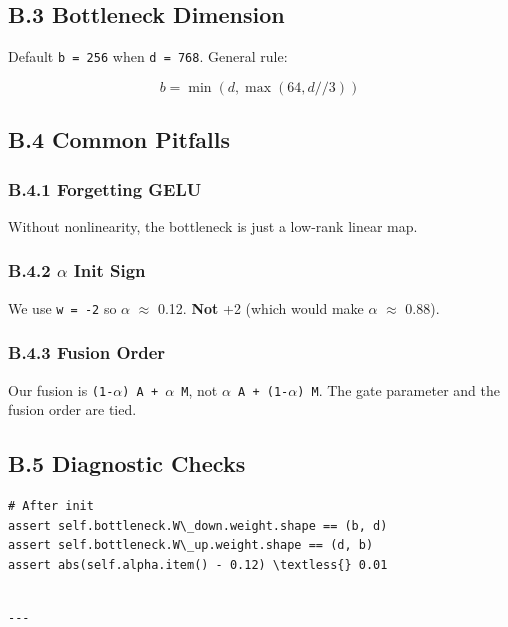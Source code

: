\subsection{B.3 Bottleneck Dimension}

Default \texttt{b = 256} when \texttt{d = 768}. General rule:

\[
b = \min(d, \max(64, d // 3))
\tag{B.1}
\]

\subsection{B.4 Common Pitfalls}

\subsubsection{B.4.1 Forgetting GELU}

Without nonlinearity, the bottleneck is just a low-rank linear map.

\subsubsection{B.4.2 $\alpha$ Init Sign}

We use \texttt{w  = -2} so $\alpha$  $\approx$ 0.12. \textbf{Not} +2 (which would make $\alpha$ $\approx$ 0.88).

\subsubsection{B.4.3 Fusion Order}

Our fusion is \texttt{(1-$\alpha$) A + $\alpha$ M}, not \texttt{$\alpha$ A + (1-$\alpha$) M}. The gate parameter 
and the fusion order are tied.

\subsection{B.5 Diagnostic Checks}

\begin{lstlisting}
# After init
assert self.bottleneck.W\_down.weight.shape == (b, d)
assert self.bottleneck.W\_up.weight.shape == (d, b)
assert abs(self.alpha.item() - 0.12) \textless{} 0.01
\end{lstlisting}
\begin{lstlisting}

---
\end{lstlisting}